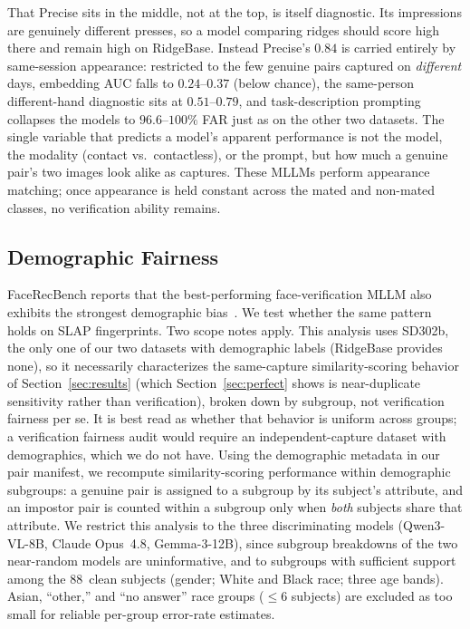 \documentclass[journal]{IEEEtran}
\begin{document}
That Precise sits in the middle, not at the top, is itself diagnostic. Its
impressions are genuinely different presses, so a model comparing ridges should
score high there and remain high on RidgeBase. Instead Precise's $0.84$ is
carried entirely by same-session appearance: restricted to the few genuine pairs
captured on \emph{different} days, embedding AUC falls to $0.24$--$0.37$ (below
chance), the same-person different-hand diagnostic sits at $0.51$--$0.79$, and
task-description prompting collapses the models to $96.6$--$100\%$ FAR just as on
the other two datasets. The single variable that predicts a model's apparent
performance is not the model, the modality (contact vs.\ contactless), or the
prompt, but how much a genuine pair's two images look alike as captures. These
MLLMs perform appearance matching; once appearance is held constant across the
mated and non-mated classes, no verification ability remains.

\subsection{Demographic Fairness}
\label{sec:fairness}

FaceRecBench reports that the best-performing face-verification MLLM also
exhibits the strongest demographic bias~\cite{facerecbench2025}.
We test whether the same pattern holds on SLAP fingerprints. Two scope notes
apply. This analysis uses SD302b, the only one of our two datasets with
demographic labels (RidgeBase provides none), so it necessarily characterizes
the same-capture similarity-scoring behavior of Section~\ref{sec:results} (which
Section~\ref{sec:perfect} shows is near-duplicate sensitivity rather than
verification), broken down by subgroup, not verification fairness per se. It is
best read as whether that behavior is uniform across groups; a verification
fairness audit would require an independent-capture dataset with demographics,
which we do not have.
Using the demographic metadata in our pair manifest, we recompute
similarity-scoring performance within demographic subgroups: a genuine
pair is assigned to a subgroup by its subject's attribute, and an impostor
pair is counted within a subgroup only when \emph{both} subjects share that
attribute. We restrict this analysis to the three discriminating models
(Qwen3-VL-8B, Claude Opus~4.8, Gemma-3-12B), since subgroup breakdowns of
the two near-random models are uninformative, and to subgroups with
sufficient support among the 88~clean subjects (gender; White and Black
race; three age bands). Asian, ``other,'' and ``no answer'' race groups
($\leq 6$ subjects) are excluded as too small for reliable per-group
error-rate estimates.
\end{document}
